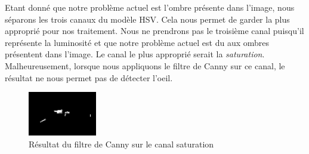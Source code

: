 Etant donné que notre problème actuel est l'ombre présente dans l'image, nous séparons les trois canaux du modèle HSV. Cela
nous permet de garder la plus approprié pour nos traitement. Nous ne prendrons pas le troisième canal puisqu'il représente 
la luminosité et que notre problème actuel est du aux ombres présentent dans l'image. Le canal le plus approprié serait la \textit{saturation}. 
Malheureusement, lorsque nous appliquons le filtre de Canny sur ce canal, le résultat ne nous permet pas de détecter l'oeil.

\begin{figure}[H]
 \center
 \includegraphics[width=3cm]{image/cannySaturation.png}
 \caption{Résultat du filtre de Canny sur le canal saturation}
\end{figure}


% 
% 
% 
% 
% 

